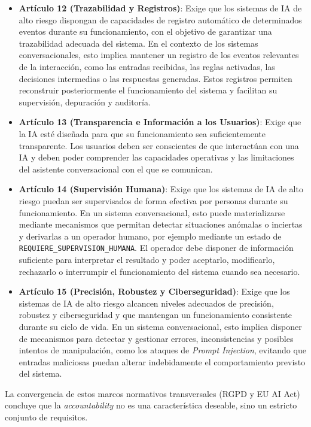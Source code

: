 \documentclass[12pt,a4paper]{report}
\begin{document}
\begin{itemize}
    \item \textbf{Artículo 12 (Trazabilidad y Registros)}: Exige que los sistemas de IA de alto riesgo dispongan de capacidades de registro automático de determinados eventos durante su funcionamiento, con el objetivo de garantizar una trazabilidad adecuada del sistema. En el contexto de los sistemas conversacionales, esto implica mantener un registro de los eventos relevantes de la interacción, como las entradas recibidas, las reglas activadas, las decisiones intermedias o las respuestas generadas. Estos registros permiten reconstruir posteriormente el funcionamiento del sistema y facilitan su supervisión, depuración y auditoría.
    \item \textbf{Artículo 13 (Transparencia e Información a los Usuarios)}: Exige que la IA esté diseñada para que su funcionamiento sea suficientemente transparente. Los usuarios deben ser conscientes de que interactúan con una IA y deben poder comprender las capacidades operativas y las limitaciones del asistente conversacional con el que se comunican.
    \item \textbf{Artículo 14 (Supervisión Humana)}: Exige que los sistemas de IA de alto riesgo puedan ser supervisados de forma efectiva por personas durante su funcionamiento. En un sistema conversacional, esto puede materializarse mediante mecanismos que permitan detectar situaciones anómalas o inciertas y derivarlas a un operador humano, por ejemplo mediante un estado de \texttt{REQUIERE\_SUPERVISION\_HUMANA}. El operador debe disponer de información suficiente para interpretar el resultado y poder aceptarlo, modificarlo, rechazarlo o interrumpir el funcionamiento del sistema cuando sea necesario.
    \item \textbf{Artículo 15 (Precisión, Robustez y Ciberseguridad)}: Exige que los sistemas de IA de alto riesgo alcancen niveles adecuados de precisión, robustez y ciberseguridad y que mantengan un funcionamiento consistente durante su ciclo de vida. En un sistema conversacional, esto implica disponer de mecanismos para detectar y gestionar errores, inconsistencias y posibles intentos de manipulación, como los ataques de \textit{Prompt Injection}, evitando que entradas maliciosas puedan alterar indebidamente el comportamiento previsto del sistema.
\end{itemize}

La convergencia de estos marcos normativos transversales (RGPD y EU AI Act) concluye que la \textit{accountability} no es una característica deseable, sino un estricto conjunto de requisitos.
\end{document}
